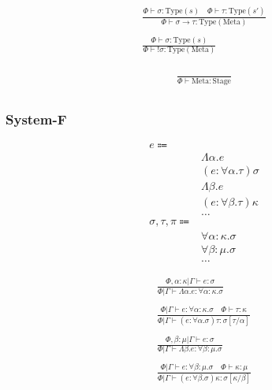 \documentclass {article}
\begin{document}
\begin{gather*}
\frac
{\Phi \vdash \sigma : \text{Type} (s) \quad \Phi \vdash \tau : \text{Type} (s')}
{\Phi \vdash \sigma \to \tau : \text{Type} (\text{Meta})} \\
\\
\frac
{\Phi \vdash \sigma : \text{Type} (s)}
{\Phi \vdash !\sigma : \text{Type} (\text{Meta})} \\
\end{gather*}

\begin{gather*}
\frac
{}
{\Phi \vdash \text{Meta} : \text{Stage}} \\
\end{gather*}

\subsubsection{System-F}
\begin{align*}
e \Coloneqq & \\
& \Lambda \alpha. e \tag{Type Lambda} \\
& (e : \forall \alpha. \tau) \sigma \tag{Type Application} \\
& \Lambda \beta. e \tag{Kind Lambda} \\
& (e : \forall \beta. \tau) \kappa \tag{Kind Application} \\
& \dots \\
\sigma, \tau, \pi \Coloneqq & \\
& \forall \alpha : \kappa. \sigma \tag{Type Forall}\\ 
& \forall \beta : \mu. \sigma \tag{Kind Forall}\\
& \dots
\end{align*}

\begin{gather*}
\frac
{\Phi, \alpha : \kappa | \Gamma \vdash e : \sigma}
{\Phi | \Gamma \vdash \Lambda \alpha. e : \forall \alpha : \kappa. \sigma } \\
\\
\frac
{\Phi | \Gamma \vdash e : \forall \alpha : \kappa. \sigma \quad \Phi \vdash \tau : \kappa }
{\Phi | \Gamma \vdash (e : \forall \alpha. \sigma) \tau : \sigma [\tau/\alpha] } \\
\\
\frac
{\Phi, \beta : \mu | \Gamma \vdash e : \sigma}
{\Phi | \Gamma \vdash \Lambda \beta. e : \forall \beta : \mu. \sigma} \\
\\
\frac
{\Phi | \Gamma \vdash e : \forall \beta : \mu. \sigma \quad \Phi \vdash \kappa : \mu}
{\Phi | \Gamma \vdash (e : \forall \beta. \sigma) \kappa : \sigma [\kappa/\beta]} \\
\end{gather*}
\end{document}
